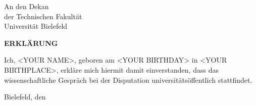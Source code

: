 \documentclass[11pt,a4paper]{article}
\begin{document}
\pagestyle{empty}
\noindent
An den Dekan\\
der Technischen Fakult\"at\\
Universit\"at Bielefeld

\vspace{2cm}

\begin{center}
  {\bf \Large ERKL\"ARUNG}
\end{center}

\vspace{2cm}

\noindent Ich, <YOUR NAME>, geboren am <YOUR BIRTHDAY> in <YOUR BIRTHPLACE>, erkl\"are mich hiermit damit einverstanden, dass das wissenschaftliche Gespr\"ach bei
der Disputation universit\"ats\"offentlich stattfindet.

\vspace{4cm}


\noindent Bielefeld, den \date {}
\end{document}
